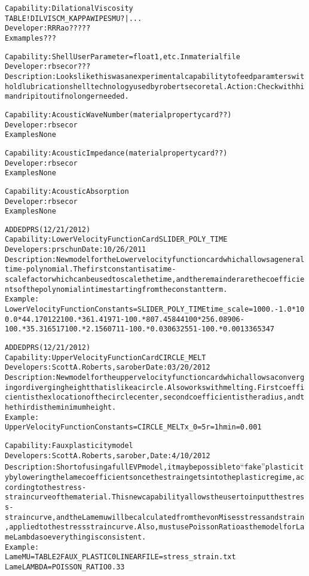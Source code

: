 \documentclass{article}
\begin{document}
\begin{alltt}
Capability: Dilational Viscosity 
{TABLE ! DILVISCM_KAPPAWIPESMU? | ...}
Developer: RRRao?????
Exmamples???  

Capability: Shell User Parameter = float 1, etc.   In material file
Developer: rbsecor???
Description:  Looks like this was an experimental capability to feed paramters with old lubrication shell technology used by robert secor et al.   Action: Check with him and rip it out if no longer needed.  

Capability: Acoustic Wave Number (material property card??)
Developer: rbsecor  
Examples None

Capability: Acoustic Impedance (material property card??)
Developer: rbsecor  
Examples None

Capability: Acoustic Absorption
Developer: rbsecor  
Examples None

ADDED PRS (12/21/2012)
Capability: Lower Velocity Function Card SLIDER_POLY_TIME
Developers: prschun Date: 10/26/2011
Description: New model for the Lower velocity function card which allows a general time-polynomial.   The first constant is a time-scale factor which can be used to scale the time, and the remainder are the coefficients of the polynomial in time starting from the constant term.  
Example: 
Lower Velocity Function Constants = SLIDER_POLY_TIME   {time_scale = 1000.} {-1.0*100.0*44.170122} {100.*361.41971} {-100.*807.45844} {100*256.08906}  {-100.*35.316517} {100.*2.1560711} {-100.*0.030632551} {-100.*0.0013365347}

ADDED PRS (12/21/2012)
Capability: Upper Velocity Function Card CIRCLE_MELT
Developers: Scott A. Roberts, sarober Date: 03/20/2012
Description: New model for the upper velocity function card which allows a converging or diverging height that is like a circle.  Also works with melting.  First coefficient is the x location of the circle center, second coefficient is the radius, and the third is the minimum height. 
Example: 
Upper Velocity Function Constants = CIRCLE_MELT {x_0=5} {r=1} {hmin=0.001}  

Capability:  Faux plasticity model
Developers:  Scott A. Roberts, sarober, Date:  4/10/2012
Description:  Short of using a full EVP model, it may be possible to ``fake'' plasticity by lowering the lame coefficients once the strain gets into the plastic regime, according to the stress-strain curve of the material.  This new capability allows the user to input the stress-strain curve, and the Lame mu will be calculated from the von Mises stress and strain, applied to the stress strain curve.  Also, must use Poisson Ratio as the model for Lame Lambda so everything is consistent.
Example:
Lame MU       = TABLE 2 FAUX_PLASTIC 0 LINEAR FILE=stress_strain.txt
Lame LAMBDA   = POISSON_RATIO 0.33


\end{alltt}
\end{document}
